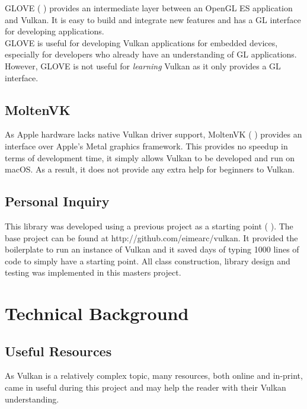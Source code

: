 \documentclass[12pt]{report}
\newcommand{\citebu}[1]{(\citenoparen{#1})}
\newcommand{\citenoparen}[1]{\citeauthor{#1} \citeyear{#1}}
\newcommand{\citesoftware}[1]{(\citeauthor{#1} \citeyear{#1})}
\theoremstyle{definition}
\begin{document}
      GLOVE \citesoftware{glove} provides an intermediate layer
      between an OpenGL ES application and Vulkan. It is easy to build and
      integrate new features and has a GL interface for developing applications. \\

      GLOVE is useful for developing Vulkan applications for embedded devices,
      especially for developers who already have an understanding of GL
      applications. However, GLOVE is not useful for \textit{learning} Vulkan
      as it only provides a GL interface.

    \section{MoltenVK}

      As Apple hardware lacks native Vulkan driver support, MoltenVK
      \citesoftware{moltenvk} provides an interface over Apple's Metal graphics framework. This provides no
      speedup in terms of development time, it simply allows Vulkan to
      be developed and run on macOS. As a result, it does not provide any
      extra help for beginners to Vulkan.

    \section{Personal Inquiry}

      This library was developed using a previous project as a starting point \citebu{personalinquiry}.
      The base project can be found at http://github.com/eimearc/vulkan.
      It provided the boilerplate to run an instance of Vulkan and it
      saved days of typing 1000 lines of code to simply have a
      starting point. All class construction, library design
      and testing was implemented in this masters project.

  \chapter{Technical Background}

    \section{Useful Resources}

      As Vulkan is a relatively complex topic, many resources, both online and
      in-print, came in useful during this project and may help the reader
      with their Vulkan understanding.
\end{document}
